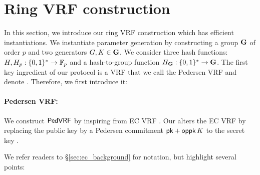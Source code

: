 \section{Ring VRF construction}%
\label{sec:pederson_vrf}

In this section, we introduce our ring VRF construction which has efficient instantiations. 
We instantiate parameter generation by constructing a group ${\mathbf{G}}$ of order $ p $ and two generators $ G, K \in  {\mathbf{G}}$.  We consider three hash functions: $ H, H_p: \{0,1\}^* \rightarrow \mathbb{F}_p $ and a hash-to-group function $H_{{\mathbf{G}}} : \{0,1\}^* \rightarrow {\mathbf{G}}$.
The first key ingredient of our protocol is a VRF that we  call the Pedersen VRF and denote \PedVRF. Therefore, we first introduce it:

\paragraph{Pedersen VRF:} We construct $ {\mathsf{PedVRF}} $ by inspiring from EC VRF  \cite{nsec5,VXEd25519,draft-irtf-cfrg-vrf-10}.
%
Our \PedVRF alters the EC VRF by replacing the public key by
a Pedersen commitment $\mathsf{pk} + \mathsf{oppk} \, K$ to the secret key \sk.%


We refer readers to \S\ref{sec:ec_background} for notation,
 but highlight several points: 
%

